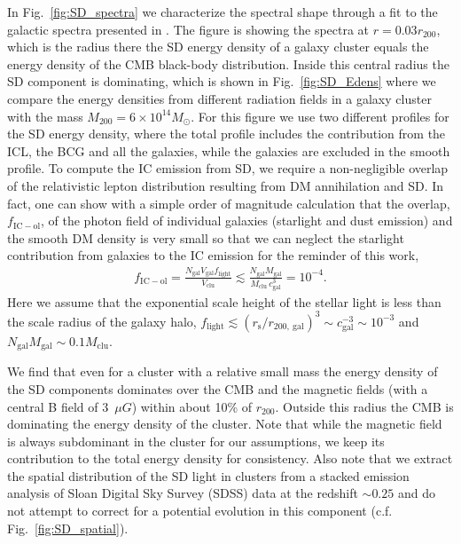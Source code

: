 \documentclass[10pt,aps,pra,reprint,amsmath,amsfonts,amssymb,showpacs,nofootinbib,floatfix]{revtex4-1}
\newcommand{\rmn}{\mathrm}
\newcommand{\msun}{M_\odot}
\newcommand{\rvir}{r_{200}}
\newcommand{\mvir}{M_{200}}
\begin{document}
In Fig.~\ref{fig:SD_spectra} we characterize the spectral shape
through a fit to the galactic spectra presented in
\cite{2006ApJ...648L..29P}.  The figure is showing the spectra at
$r=0.03\rvir$, which is the radius there the SD energy density of a
galaxy cluster equals the energy density of the CMB black-body
distribution. Inside this central radius the SD component is
dominating, which is shown in Fig.~\ref{fig:SD_Edens} where we compare
the energy densities from different radiation fields in a galaxy
cluster with the mass $\mvir=6\times10^{14}\msun$. For this figure we
use two different profiles for the SD energy density, where the total
profile includes the contribution from the ICL, the BCG and all the
galaxies, while the galaxies are excluded in the smooth profile. To
compute the IC emission from SD, we require a non-negligible overlap
of the relativistic lepton distribution resulting from DM annihilation
and SD.  In fact, one can show with a simple order of magnitude
calculation that the overlap, $f_\rmn{IC-ol}$, of the photon field of
individual galaxies (starlight and dust emission) and the smooth DM
density is very small so that we can neglect the starlight
contribution from galaxies to the IC emission for the reminder of this
work,
\begin{eqnarray}
\label{eq:SD_overlap}
f_\rmn{IC-ol} = \frac{N_\rmn{gal} V_\rmn{gal} f_\rmn{light}}{V_\rmn{clu}}
\lesssim  \frac{N_\rmn{gal} M_\rmn{gal}}{M_\rmn{clu}\,c_\rmn{gal}^{3}}=10^{-4}.
\end{eqnarray}
Here we assume that the exponential scale height of the stellar light
is less than the scale radius of the galaxy halo, $f_\rmn{light}
\lesssim (r_\rmn{s} / r_{200,~\rmn{gal}})^3 \sim c_\rmn{gal}^{-3} \sim
10^{-3}$ and $N_\rmn{gal} M_\rmn{gal} \sim 0.1 M_\rmn{clu}$.

We find that even for a cluster with a relative small mass the energy
density of the SD components dominates over the CMB and the magnetic
fields (with a central B field of 3~$\mu G$) within about 10\% of
$\rvir$. Outside this radius the CMB is dominating the energy density
of the cluster.  Note that while the magnetic field is always
subdominant in the cluster for our assumptions, we keep its
contribution to the total energy density for consistency. Also note
that we extract the spatial distribution of the SD light in clusters
from a stacked emission analysis of Sloan Digital Sky Survey (SDSS)
data at the redshift $\sim 0.25$ \cite{2005MNRAS.358..949Z} and do not
attempt to correct for a potential evolution in this component
(c.f. Fig.~\ref{fig:SD_spatial}).
\end{document}
